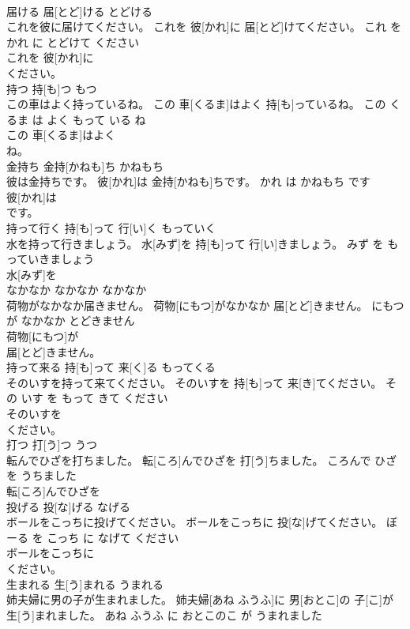 \documentclass[8pt]{extreport}
\begin{document}
\begin{CJK}{UTF8}{min}
\\	届ける	届[とど]ける	とどける	
\\	これを彼に届けてください。	これを 彼[かれ]に 届[とど]けてください。	これ を かれ に とどけて ください	
\\	これを 彼[かれ]に
\\	ください。			
\\	持つ	持[も]つ	もつ	
\\	この車はよく持っているね。	この 車[くるま]はよく 持[も]っているね。	この くるま は よく もって いる ね	
\\	この 車[くるま]はよく
\\	ね。			
\\	金持ち	金持[かねも]ち	かねもち	
\\	彼は金持ちです。	彼[かれ]は 金持[かねも]ちです。	かれ は かねもち です	
\\	彼[かれ]は
\\	です。			
\\	持って行く	持[も]って 行[い]く	もっていく	
\\	水を持って行きましょう。	水[みず]を 持[も]って 行[い]きましょう。	みず を もっていきましょう	
\\	水[みず]を
\\	なかなか	なかなか	なかなか	
\\	荷物がなかなか届きません。	荷物[にもつ]がなかなか 届[とど]きません。	にもつ が なかなか とどきません	
\\	荷物[にもつ]が
\\	届[とど]きません。			
\\	持って来る	持[も]って 来[く]る	もってくる	
\\	そのいすを持って来てください。	そのいすを 持[も]って 来[き]てください。	その いす を もって きて ください	
\\	そのいすを
\\	ください。			
\\	打つ	打[う]つ	うつ	
\\	転んでひざを打ちました。	転[ころ]んでひざを 打[う]ちました。	ころんで ひざ を うちました	
\\	転[ころ]んでひざを
\\	投げる	投[な]げる	なげる	
\\	ボールをこっちに投げてください。	ボールをこっちに 投[な]げてください。	ぼーる を こっち に なげて ください	
\\	ボールをこっちに
\\	ください。			
\\	生まれる	生[う]まれる	うまれる	
\\	姉夫婦に男の子が生まれました。	姉夫婦[あね ふうふ]に 男[おとこ]の 子[こ]が 生[う]まれました。	あね ふうふ に おとこのこ が うまれました	

\end{CJK}
\end{document}
